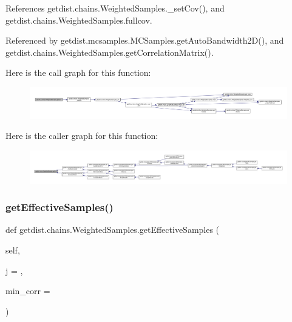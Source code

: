 References getdist.\+chains.\+Weighted\+Samples.\+\_\+set\+Cov(), and getdist.\+chains.\+Weighted\+Samples.\+fullcov.



Referenced by getdist.\+mcsamples.\+M\+C\+Samples.\+get\+Auto\+Bandwidth2\+D(), and getdist.\+chains.\+Weighted\+Samples.\+get\+Correlation\+Matrix().

Here is the call graph for this function\+:
\nopagebreak
\begin{figure}[H]
\begin{center}
\leavevmode
\includegraphics[width=350pt]{classgetdist_1_1chains_1_1WeightedSamples_a8bdc8f5cf4d672d27a2c2d64eb2c8cc8_cgraph}
\end{center}
\end{figure}
Here is the caller graph for this function\+:
\nopagebreak
\begin{figure}[H]
\begin{center}
\leavevmode
\includegraphics[width=350pt]{classgetdist_1_1chains_1_1WeightedSamples_a8bdc8f5cf4d672d27a2c2d64eb2c8cc8_icgraph}
\end{center}
\end{figure}
\mbox{\label{classgetdist_1_1chains_1_1WeightedSamples_a2a9c6bc9d303e07c06cd8d44a6c67838}} 
\subsubsection{\texorpdfstring{get\+Effective\+Samples()}{getEffectiveSamples()}}
{\footnotesize\ttfamily def getdist.\+chains.\+Weighted\+Samples.\+get\+Effective\+Samples (\begin{DoxyParamCaption}\item[{}]{self,  }\item[{}]{j = {},  }\item[{}]{min\+\_\+corr = {} }\end{DoxyParamCaption})}


